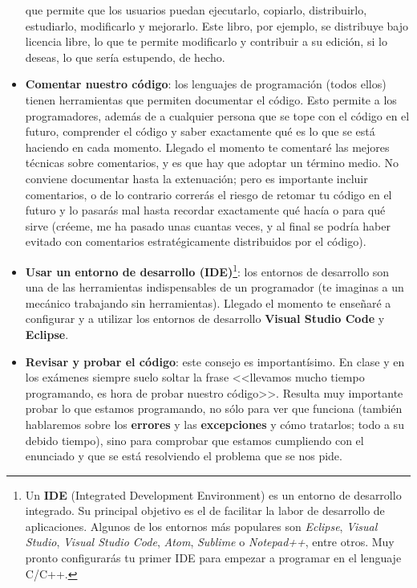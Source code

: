 \begin{itemize}
{ que permite que los usuarios puedan ejecutarlo, copiarlo, distribuirlo, estudiarlo, modificarlo y mejorarlo. Este libro, por
 ejemplo, se distribuye bajo licencia libre, lo que te permite modificarlo y contribuir a su edición, si lo deseas}, lo que sería estupendo, de hecho.
 \item \textbf{Comentar nuestro código}: los lenguajes de programación (todos ellos) tienen herramientas que permiten documentar el 
 código. Esto permite a los programadores, además de a cualquier persona que se tope con el código en el futuro, comprender el código y
 saber exactamente qué es lo que se está haciendo en cada momento. Llegado el momento te comentaré las mejores técnicas sobre comentarios, y 
 es que hay que adoptar un término medio. No conviene documentar hasta la extenuación; pero es importante incluir comentarios, o de lo contrario
 correrás el riesgo de retomar tu código en el futuro y lo pasarás mal hasta recordar exactamente qué hacía o para qué sirve (créeme, me ha
 pasado unas cuantas veces, y al final se podría haber evitado con comentarios estratégicamente distribuidos por el código).
 \item \textbf{Usar un entorno de desarrollo (IDE)}\footnote{Un \textbf{IDE} (Integrated Development Environment) es un entorno de desarrollo
 integrado. Su principal objetivo es el de facilitar la labor de desarrollo de aplicaciones. Algunos de los entornos más populares son
 \textit{Eclipse}, \textit{Visual Studio}, \textit{Visual Studio Code}, \textit{Atom}, \textit{Sublime} o \textit{Notepad++}, entre otros. Muy pronto configurarás tu primer IDE para
 empezar a programar en el lenguaje C/C++.}: los entornos de desarrollo son una de las herramientas indispensables de un programador 
 (te imaginas a un mecánico trabajando sin herramientas). Llegado el momento te enseñaré a configurar y a utilizar los entornos de
 desarrollo \textbf{Visual Studio Code} y \textbf{Eclipse}.
 \item \textbf{Revisar y probar el código}: este consejo es importantísimo. En clase y en los exámenes siempre suelo soltar la frase
 <<llevamos mucho tiempo programando, es hora de probar nuestro código>>. Resulta muy importante probar lo que estamos programando, no
 sólo para ver que funciona (también hablaremos sobre los \textbf{errores} y las \textbf{excepciones} y cómo tratarlos; todo a su debido tiempo), sino 
 para comprobar que estamos cumpliendo con el enunciado y que se está resolviendo el problema que se nos pide.
\end{itemize}


